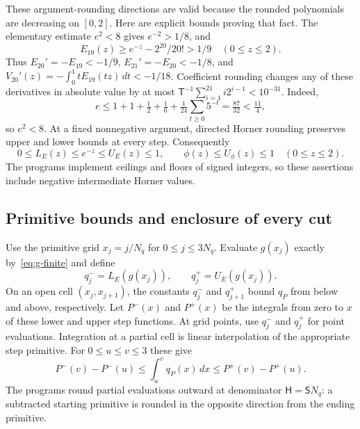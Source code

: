 \documentclass[11pt]{article}
\numberwithin{equation}{section}
\theoremstyle{definition}
\begin{document}
These argument-rounding directions are valid because the rounded
polynomials are decreasing on $[0,2]$. Here are explicit bounds proving
that fact. The elementary estimate $e^2<8$ gives $e^{-2}>1/8$, and
\[
 E_{19}(z)\ge e^{-z}-2^{20}/20!>1/9\quad(0\le z\le2).
\]
Thus $E_{20}'=-E_{19}<-1/9$, $E_{21}'=-E_{20}<-1/8$, and
$V_{20}'(z)=-\int_0^1tE_{19}(tz)\,dt<-1/18$.
Coefficient rounding changes any of these derivatives in absolute
value by at most
$\mathsf T^{-1}\sum_{i=1}^{21}i2^{i-1}<10^{-31}$.
Indeed,
\[
 e\le1+1+\tfrac12+\tfrac16+
       \tfrac1{24}\sum_{t\ge0}5^{-t}=\tfrac{87}{32}<\tfrac{11}{4},
\]
so $e^2<8$.
At a fixed nonnegative argument, directed Horner rounding preserves
upper and lower bounds at every step. Consequently
\begin{equation}\label{eq:oracle-bounds}
 0\le L_E(z)\le e^{-z}\le U_E(z)\le1,\qquad
 \phi(z)\le U_\phi(z)\le1
 \quad(0\le z\le2).
\end{equation}
The programs implement ceilings and floors of signed integers, so
these assertions include negative intermediate Horner values.

\subsection{Primitive bounds and enclosure of every cut}

Use the primitive grid $x_j=j/N_q$ for $0\le j\le3N_q$.
Evaluate $g(x_j)$ exactly by~\eqref{eq:g-finite} and define
\[
 q_j^-=L_E(g(x_j)),\qquad q_j^+=U_E(g(x_j)).
\]
On an open cell $(x_j,x_{j+1})$, the constants $q_j^-$ and
$q_{j+1}^+$ bound $q_P$ from below and above, respectively.
Let $P^-(x)$ and $P^+(x)$ be the integrals from zero to $x$ of
these lower and upper step functions. At grid points, use $q_j^-$
and $q_j^+$ for point evaluations. Integration at a partial cell is
linear interpolation of the appropriate step primitive.
For $0\le u\le v\le3$ these give
\begin{equation}\label{eq:primitive-bounds}
 P^-(v)-P^-(u)\le\int_u^vq_P(x)\,dx
                    \le P^+(v)-P^+(u).
\end{equation}
The programs round partial evaluations outward at denominator
$\mathsf H=\mathsf S N_q$: a subtracted starting primitive is rounded
in the opposite direction from the ending primitive.
\end{document}

